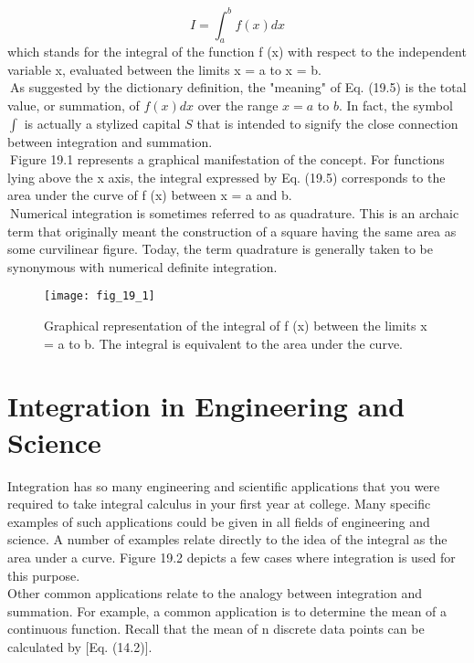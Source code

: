 \documentclass[../main.tex]{subfiles}
\begin{document}
\begin{equation}
	\tag{19.5}
	I=\int_{a}^{b} f(x) d x
	\end{equation}
	which stands for the integral of the function f (x) with respect to the independent variable
	x, evaluated between the limits x = a to x = b.\\
	$\>$As suggested by the dictionary definition, the "meaning" of Eq. (19.5) is the total value, or summation, of $f(x) d x$ over the range $x=a$ to $b$. In fact, the symbol $\int$ is actually a stylized capital $S$ that is intended to signify the close connection between integration and summation.
	\\$\>$Figure 19.1 represents a graphical manifestation of the concept. For functions lying
	above the x axis, the integral expressed by Eq. (19.5) corresponds to the area under the
	curve of f (x) between x = a and b.\\
	$\>$Numerical integration is sometimes referred to as quadrature. This is an archaic term
that originally meant the construction of a square having the same area as some curvilinear
figure. Today, the term quadrature is generally taken to be synonymous with numerical
definite integration. 

\begin{figure}[H]
    \centering
    \texttt{[image: fig\_19\_1]}
   \caption{\textsf{Graphical representation of the integral of f (x) between the limits x = a to b. The integral is
   equivalent to the area under the curve.}}\label{fig:fig_19_1}
\end{figure}

\section{Integration in Engineering and Science}
Integration has so many engineering and scientific applications that you were required to
take integral calculus in your first year at college. Many specific examples of such applications could be given in all fields of engineering and science. A number of examples relate directly to the idea of the integral as the area under a curve. Figure 19.2 depicts a few
cases where integration is used for this purpose.\\

Other common applications relate to the analogy between integration and summation.
For example, a common application is to determine the mean of a continuous function.
Recall that the mean of n discrete data points can be calculated by [Eq. (14.2)].
\end{document}
